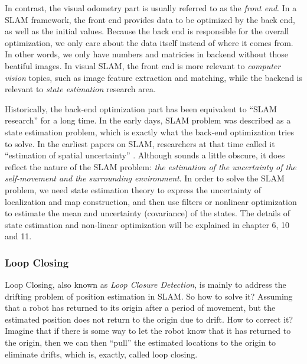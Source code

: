 In contrast, the visual odometry part is usually referred to as the \emph{front end}. In a SLAM framework, the front end provides data to be optimized by the back end, as well as the initial values. Because the back end is responsible for the overall optimization, we only care about the data itself instead of where it comes from. In other words, we only have numbers and matricies in backend without those beatiful images. In visual SLAM, the front end is more relevant to \emph{computer vision} topics, such as image feature extraction and matching, while the backend is relevant to \emph{state estimation} research area.

Historically, the back-end optimization part has been equivalent to ``SLAM research'' for a long time. In the early days, SLAM problem was described as a state estimation problem, which is exactly what the back-end optimization tries to solve. In the earliest papers on SLAM, researchers at that time called it ``estimation of spatial uncertainty'' \cite{Smith1986, Smith1990}. Although sounds a little obscure, it does reflect the nature of the SLAM problem: \emph{the estimation of the uncertainty of the self-movement and the surrounding environment}. In order to solve the SLAM problem, we need state estimation theory to express the uncertainty of localization and map construction, and then use filters or nonlinear optimization to estimate the mean and uncertainty (covariance) of the states. The details of state estimation and non-linear optimization will be explained in chapter 6, 10 and 11.

\subsubsection{Loop Closing}
Loop Closing, also known as \emph{Loop Closure Detection}, is mainly to address the drifting problem of position estimation in SLAM. So how to solve it? Assuming that a robot has returned to its origin after a period of movement, but the estimated position does not return to the origin due to drift. How to correct it? Imagine that if there is some way to let the robot know that it has returned to the origin, then we can then ``pull'' the estimated locations to the origin to eliminate drifts, which is, exactly, called loop closing.

